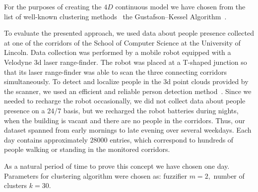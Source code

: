 For the purposes of creating the $4D$ continuous model we have chosen from the list of well-known clustering methods~\cite{kruse2007fundamentals} the Gustafson--Kessel Algorithm~\cite{gustafson1979fuzzy}. 


To evaluate the presented approach, we used data about people presence collected at one of the corridors of the School of Computer Science at the University of Lincoln.
Data collection was performed by a mobile robot equipped with a Velodyne 3d laser range-finder.
The robot was placed at a T-shaped junction so that its laser range-finder was able to scan the three connecting corridors simultaneously.
To detect and localize people in the 3d point clouds provided by the scanner, we used an efficient and reliable person detection method~\cite{yan2017online}.
Since we needed to recharge the robot occasionally, we did not collect data about people presence on a 24/7 basis, but we recharged the robot batteries during nights, when the building is vacant and there are no people in the corridors.
Thus, our dataset spanned from early mornings to late evening over several weekdays.
Each day contains approximately $28000$ entries, which correspond to hundreds of people walking or standing in the monitored corridors. 

As a natural period of time to prove this concept we have chosen one day. Parameters for clustering algorithm were chosen as: fuzzifier $m = 2,$ number of clusters $k = 30.$ 

